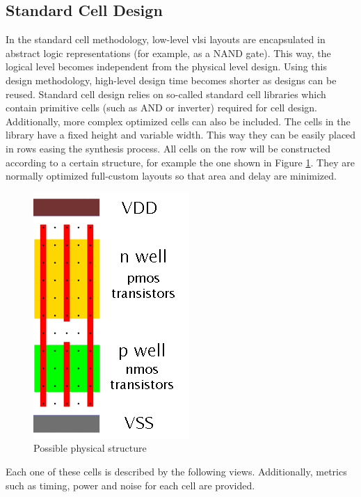 \subsection{Standard Cell Design}

In the standard cell methodology, low-level \gls{vlsi} layouts are encapsulated in abstract logic representations (for example, as a NAND gate). This way, the logical level becomes independent from the physical level design. Using this design methodology, high-level design time becomes shorter as designs can be reused. Standard cell design relies on so-called standard cell libraries which contain primitive cells (such as AND or inverter) required for cell design. Additionally, more complex optimized cells can also be included. The cells in the library have a fixed height and variable width. This way they can be easily placed in rows easing the synthesis process. All cells on the row will be constructed according to a certain structure, for example the one shown in Figure \ref{fig:structure}. They are normally optimized full-custom layouts so that area and delay are minimized. \\

	
\begin{figure}[h!]
  \centering
  \includegraphics[scale=0.55]{img/bckgrnd/structure.png}
  \caption{Possible physical structure}
  \label{fig:structure}
\end{figure}


Each one of these cells is described by the following views. Additionally, metrics such as timing, power and noise for each cell are provided. 

